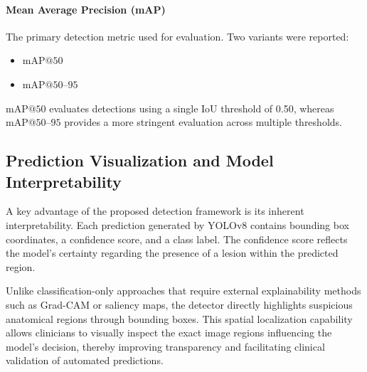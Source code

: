 \paragraph{Mean Average Precision (mAP)} The primary detection metric used for evaluation. Two variants were reported:
\begin{itemize}
	\item $\text{mAP@50}$
	\item $\text{mAP@50--95}$
\end{itemize}
$\text{mAP@50}$ evaluates detections using a single IoU threshold of 0.50, whereas $\text{mAP@50--95}$ provides a more stringent evaluation across multiple thresholds.

\subsection{Prediction Visualization and Model Interpretability}
A key advantage of the proposed detection framework is its inherent interpretability. Each prediction generated by YOLOv8 contains bounding box coordinates, a confidence score, and a class label. The confidence score reflects the model's certainty regarding the presence of a lesion within the predicted region.

Unlike classification-only approaches that require external explainability methods such as Grad-CAM or saliency maps, the detector directly highlights suspicious anatomical regions through bounding boxes. This spatial localization capability allows clinicians to visually inspect the exact image regions influencing the model's decision, thereby improving transparency and facilitating clinical validation of automated predictions.